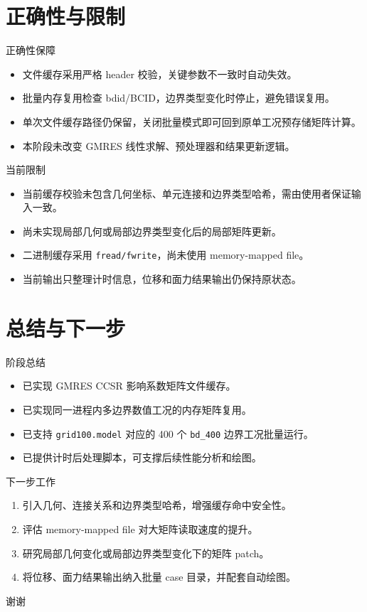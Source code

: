 \documentclass[aspectratio=169,UTF8]{ctexbeamer}
\begin{document}
\section{正确性与限制}

\begin{frame}{正确性保障}
  \begin{itemize}
    \item 文件缓存采用严格 header 校验，关键参数不一致时自动失效。
    \item 批量内存复用检查 bdid/BCID，边界类型变化时停止，避免错误复用。
    \item 单次文件缓存路径仍保留，关闭批量模式即可回到原单工况预存储矩阵计算。
    \item 本阶段未改变 GMRES 线性求解、预处理器和结果更新逻辑。
  \end{itemize}
\end{frame}

\begin{frame}{当前限制}
  \begin{itemize}
    \item 当前缓存校验未包含几何坐标、单元连接和边界类型哈希，需由使用者保证输入一致。
    \item 尚未实现局部几何或局部边界类型变化后的局部矩阵更新。
    \item 二进制缓存采用 \texttt{fread/fwrite}，尚未使用 memory-mapped file。
    \item 当前输出只整理计时信息，位移和面力结果输出仍保持原状态。
  \end{itemize}
\end{frame}

\section{总结与下一步}

\begin{frame}{阶段总结}
  \begin{itemize}
    \item 已实现 GMRES CCSR 影响系数矩阵文件缓存。
    \item 已实现同一进程内多边界数值工况的内存矩阵复用。
    \item 已支持 \texttt{grid100.model} 对应的 400 个 \texttt{bd\_400} 边界工况批量运行。
    \item 已提供计时后处理脚本，可支撑后续性能分析和绘图。
  \end{itemize}
\end{frame}

\begin{frame}{下一步工作}
  \begin{enumerate}
    \item 引入几何、连接关系和边界类型哈希，增强缓存命中安全性。
    \item 评估 memory-mapped file 对大矩阵读取速度的提升。
    \item 研究局部几何变化或局部边界类型变化下的矩阵 patch。
    \item 将位移、面力结果输出纳入批量 case 目录，并配套自动绘图。
  \end{enumerate}
\end{frame}

\begin{frame}
  \centering
  \Huge 谢谢
\end{frame}
\end{document}
